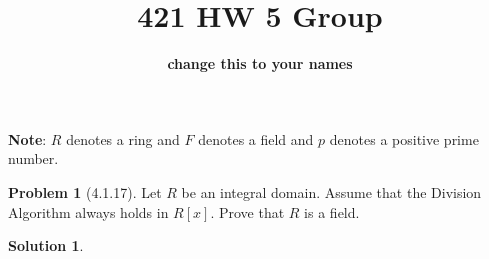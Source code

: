 \documentclass[12pt]{article}
\theoremstyle{definition}
\newtheorem*{prob}{Problem}
\newtheorem*{soln}{Solution}
\newcommand{\ZZ}{{\mathbb{Z}}}
\newcommand{\QQ}{{\mathbb{Q}}}
\begin{document}
%
\title{421 HW 5 Group}
\author{\textbf{change this to your names}}

\date{}

\maketitle

\textbf{Note}: $R$ denotes a ring and $F$ denotes a field and $p$ denotes a positive
prime number.

%
%
%



%
%


\begin{prob}[4.1.17]
Let $R$ be an integral domain. 
Assume that the Division Algorithm always holds in $R[x]$. Prove that $R$ is a field.
\end{prob}

\begin{soln}

\end{soln}


%
%
%
\end{document}
